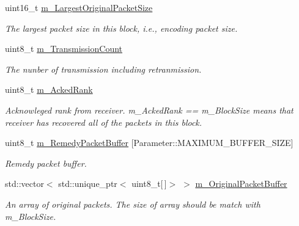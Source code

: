 \begin{DoxyCompactItemize}
uint16\+\_\+t \hyperlink{class_network_coding_1_1_transmission_block_adcc79e6bfd7282430f95268ec86369a7}{m\+\_\+\+Largest\+Original\+Packet\+Size}
\begin{DoxyCompactList}\small\item\em The largest packet size in this block, i.\+e., encoding packet size. \end{DoxyCompactList}\item 
uint8\+\_\+t \hyperlink{class_network_coding_1_1_transmission_block_a84e8b076ce5fea10351626094003cd33}{m\+\_\+\+Transmission\+Count}\hypertarget{class_network_coding_1_1_transmission_block_a84e8b076ce5fea10351626094003cd33}{}\label{class_network_coding_1_1_transmission_block_a84e8b076ce5fea10351626094003cd33}

\begin{DoxyCompactList}\small\item\em The nunber of transmission including retranmission. \end{DoxyCompactList}\item 
uint8\+\_\+t \hyperlink{class_network_coding_1_1_transmission_block_a9277a19ef3f5e5d9ecf2b7e91ee1c1dd}{m\+\_\+\+Acked\+Rank}\hypertarget{class_network_coding_1_1_transmission_block_a9277a19ef3f5e5d9ecf2b7e91ee1c1dd}{}\label{class_network_coding_1_1_transmission_block_a9277a19ef3f5e5d9ecf2b7e91ee1c1dd}

\begin{DoxyCompactList}\small\item\em Acknowleged rank from receiver. m\+\_\+\+Acked\+Rank == m\+\_\+\+Block\+Size means that receiver has recovered all of the packets in this block. \end{DoxyCompactList}\item 
uint8\+\_\+t \hyperlink{class_network_coding_1_1_transmission_block_a15538df05b3b58218d43363e8b59f27c}{m\+\_\+\+Remedy\+Packet\+Buffer} \mbox{[}Parameter\+::\+M\+A\+X\+I\+M\+U\+M\+\_\+\+B\+U\+F\+F\+E\+R\+\_\+\+S\+I\+ZE\mbox{]}\hypertarget{class_network_coding_1_1_transmission_block_a15538df05b3b58218d43363e8b59f27c}{}\label{class_network_coding_1_1_transmission_block_a15538df05b3b58218d43363e8b59f27c}

\begin{DoxyCompactList}\small\item\em Remedy packet buffer. \end{DoxyCompactList}\item 
std\+::vector$<$ std\+::unique\+\_\+ptr$<$ uint8\+\_\+t\mbox{[}$\,$\mbox{]}$>$ $>$ \hyperlink{class_network_coding_1_1_transmission_block_aeefe661df0123d02bb1fc463136d2fe5}{m\+\_\+\+Original\+Packet\+Buffer}\hypertarget{class_network_coding_1_1_transmission_block_aeefe661df0123d02bb1fc463136d2fe5}{}\label{class_network_coding_1_1_transmission_block_aeefe661df0123d02bb1fc463136d2fe5}

\begin{DoxyCompactList}\small\item\em An array of original packets. The size of array should be match with m\+\_\+\+Block\+Size. \end{DoxyCompactList}\end{DoxyCompactItemize}


